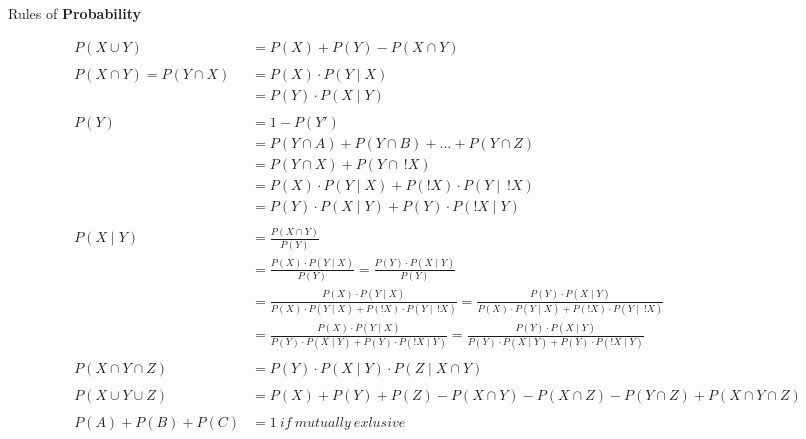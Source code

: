 \documentclass{article}
\begin{document}
\begin{small}



Rules of \textbf{Probability}

\begin{multicols}{2}
\begin{align*}
P(X \cup Y) & = P(X) + P(Y) - P(X \cap Y) \\\\
P(X \cap Y) = P(Y \cap X) & = P(X) \cdot P(Y \mid X) \\
                          & = P(Y) \cdot P(X \mid Y) \\\\
P(Y)        & = 1 - P(Y') \\
            & = P(Y \cap A) + P(Y \cap B) + ... + P(Y \cap Z)\\
            & = P(Y \cap X) + P(Y \cap \ !X) \\
            & = P(X) \cdot P(Y \mid X) + P(!X) \cdot P(Y \mid \ !X) \\
            & = P(Y) \cdot P(X \mid Y) + P(Y) \cdot P(!X \mid Y) \\\\
P(X \mid Y) & = \frac{P(X \cap Y)}{P(Y)} \\
            & = \frac{P(X) \cdot P(Y \mid X)}{P(Y)} = \frac{P(Y) \cdot P(X \mid Y)}{P(Y)} \\
            & = \frac{P(X) \cdot P(Y \mid X)}{P(X) \cdot P(Y \mid X) + P(!X) \cdot P(Y \mid \ !X)} 
              = \frac{P(Y) \cdot P(X \mid Y)}{P(X) \cdot P(Y \mid X) + P(!X) \cdot P(Y \mid \ !X)}\\
            & = \frac{P(X) \cdot P(Y \mid X)}{P(Y) \cdot P(X \mid Y) + P(Y) \cdot P(!X \mid Y)}
              = \frac{P(Y) \cdot P(X \mid Y)}{P(Y) \cdot P(X \mid Y) + P(Y) \cdot P(!X \mid Y)}\\\\
P(X \cap Y \cap Z) & = P(Y) \cdot P(X \mid Y) \cdot P(Z \mid X \cap Y)\\\\
P(X \cup Y \cup Z) & = P(X) + P(Y) + P(Z) - P(X \cap Y) - P(X \cap Z) - P(Y \cap Z) + P(X \cap Y \cap Z)\\\\
P(A) + P(B) + P(C) & = 1 \ if \ mutually \ exlusive
\end{align*}


\end{multicols}
\end{small}
\end{document}
